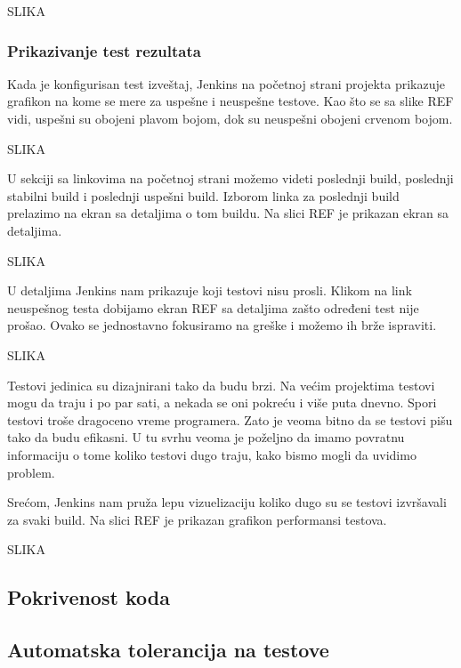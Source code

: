 SLIKA
\
\subsubsection{Prikazivanje test rezultata}
Kada je konfigurisan test izveštaj, Jenkins na početnoj strani projekta prikazuje grafikon na kome se mere za uspešne i neuspešne testove. Kao što se sa slike REF vidi, uspešni su obojeni plavom bojom, dok su neuspešni obojeni crvenom bojom. 

SLIKA

U sekciji sa linkovima na početnoj strani možemo videti poslednji build, poslednji stabilni build i poslednji uspešni build. Izborom linka za poslednji build prelazimo na ekran sa detaljima o tom buildu. Na slici REF je prikazan ekran sa detaljima. 

SLIKA

U detaljima Jenkins nam prikazuje koji testovi nisu prosli. Klikom na link neuspešnog testa dobijamo ekran REF sa detaljima zašto određeni test nije prošao. Ovako se jednostavno fokusiramo na greške i možemo ih brže ispraviti.

SLIKA

Testovi jedinica su dizajnirani tako da budu brzi. Na većim projektima testovi mogu da traju i po par sati, a nekada se oni pokreću i više puta dnevno. Spori testovi troše dragoceno vreme programera. Zato je veoma bitno da se testovi pišu tako da budu efikasni. U tu svrhu veoma je poželjno da imamo povratnu informaciju o tome koliko testovi dugo traju, kako bismo mogli da uvidimo problem. 

Srećom, Jenkins nam pruža lepu vizuelizaciju koliko dugo su se testovi izvršavali za svaki build. Na slici REF je prikazan grafikon performansi testova.

SLIKA

\subsection{Pokrivenost koda}

\subsection{Automatska tolerancija na testove}
